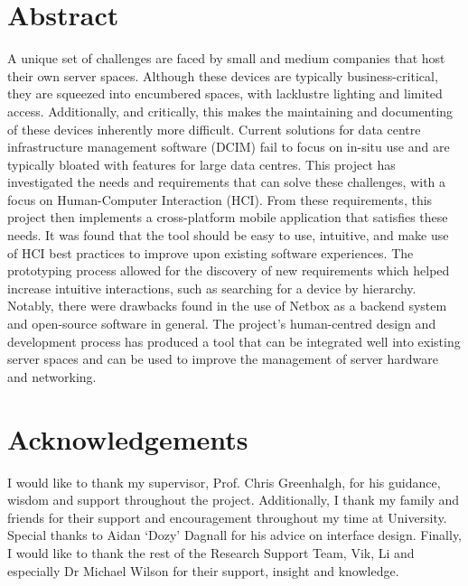 \documentclass [11pt,a4paper]{article}
\begin{document}
\section*{Abstract}
    \noindent
    A unique set of challenges are faced by small and medium companies that host their own server spaces. Although these devices are typically business-critical, they are squeezed into encumbered spaces, with lacklustre lighting and limited access. Additionally, and critically, this makes the maintaining and documenting of these devices inherently more difficult. Current solutions for data centre infrastructure management software (DCIM) fail to focus on in-situ use and are typically bloated with features for large data centres. This project has investigated the needs and requirements that can solve these challenges, with a focus on Human-Computer Interaction (HCI). From these requirements, this project then implements a cross-platform mobile application that satisfies these needs. It was found that the tool should be easy to use, intuitive, and make use of HCI best practices to improve upon existing software experiences. The prototyping process allowed for the discovery of new requirements which helped increase intuitive interactions, such as searching for a device by hierarchy. Notably, there were drawbacks found in the use of Netbox as a backend system and open-source software in general. The project's human-centred design and development process has produced a tool that can be integrated well into existing server spaces and can be used to improve the management of server hardware and networking.

\section*{Acknowledgements}
    \noindent
    I would like to thank my supervisor, Prof. Chris Greenhalgh, for his guidance, wisdom and support throughout the project. Additionally, I thank my family and friends for their support and encouragement throughout my time at University. Special thanks to Aidan `Dozy' Dagnall for his advice on interface design.
    Finally, I would like to thank the rest of the Research Support Team, Vik, Li and especially Dr Michael Wilson for their support, insight and knowledge.

\pagebreak

\tableofcontents
\pagebreak 
{}    

\setlength{\parskip}{2ex}
\end{document}
